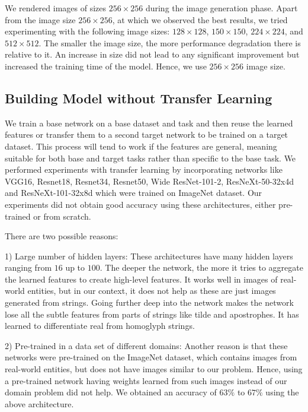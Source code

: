 \documentclass[letterpaper]{article} \usepackage{aaai22}  \usepackage{times}  \usepackage{helvet}  \usepackage{courier}  \usepackage[hyphens]{url}  \usepackage{graphicx} \urlstyle{rm} \def\UrlFont{\rm}  \usepackage{natbib}  \usepackage{caption} \DeclareCaptionStyle{ruled}{labelfont=normalfont,labelsep=colon,strut=off} \frenchspacing  \setlength{\pdfpagewidth}{8.5in}  \setlength{\pdfpageheight}{11in}  \usepackage{algorithm}
\begin{document}
We rendered images of sizes $256\times256$ during the image generation phase. Apart from the image size $256\times256$, at which we observed the best results, we tried experimenting with the following image sizes: $128\times128$, $150\times150$, $224\times224$, and $512\times512$. The smaller the image size, the more performance degradation there is relative to it. An increase in size did not lead to any significant improvement but increased the training time of the model. Hence, we use $256\times256$ image size.

\subsection{Building Model without Transfer Learning}
We train a base network on a base dataset and task and then reuse the learned features or transfer them to a second target network to be trained on a target dataset. This process will tend to work if the features are general, meaning suitable for both base and target tasks rather than specific to the base task. We performed experiments with transfer learning\cite{pan2009survey} by incorporating networks like VGG16\cite{simonyan2014very}, Resnet18\cite{he2016deep}, Resnet34, Resnet50, Wide ResNet-101-2, ResNeXt-50-32x4d and ResNeXt-101-32x8d which were trained on ImageNet\cite{deng2009imagenet} dataset. Our experiments did not obtain good accuracy using these architectures, either pre-trained or from scratch.

There are two possible reasons: 

1) Large number of hidden layers: These architectures have many hidden layers ranging from $16$ up to $100$. The deeper the network, the more it tries to aggregate the learned features to create high-level features. It works well in images of real-world entities, but in our context, it does not help as these are just images generated from strings. Going further deep into the network makes the network lose all the subtle features from parts of strings like tilde and apostrophes. It has learned to differentiate real from homoglyph strings. 

2) Pre-trained in a data set of different domains: Another reason is that these networks were pre-trained on the ImageNet dataset, which contains images from real-world entities, but does not have images similar to our problem. Hence, using a pre-trained network having weights learned from such images instead of our domain problem did not help. We obtained an accuracy of $63\%$ to $67\%$ using the above architecture.
\end{document}
